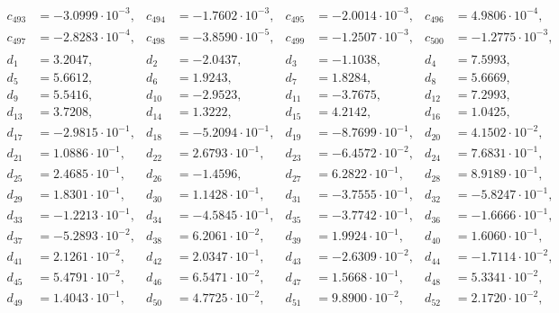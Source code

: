 \begin{align*}
c_{ 493 } &= -3.0999 \cdot 10^{ -3 }, & c_{ 494 } &= -1.7602 \cdot 10^{ -3 }, & c_{ 495 } &= -2.0014 \cdot 10^{ -3 }, & c_{ 496 } &= 4.9806 \cdot 10^{ -4 },\\ 
c_{ 497 } &= -2.8283 \cdot 10^{ -4 }, & c_{ 498 } &= -3.8590 \cdot 10^{ -5 }, & c_{ 499 } &= -1.2507 \cdot 10^{ -3 }, & c_{ 500 } &= -1.2775 \cdot 10^{ -3 },\\ 
&&&&&&& \\ 
d_{ 1 } &= 3.2047, & d_{ 2 } &= -2.0437, & d_{ 3 } &= -1.1038, & d_{ 4 } &= 7.5993,\\ 
d_{ 5 } &= 5.6612, & d_{ 6 } &= 1.9243, & d_{ 7 } &= 1.8284, & d_{ 8 } &= 5.6669,\\ 
d_{ 9 } &= 5.5416, & d_{ 10 } &= -2.9523, & d_{ 11 } &= -3.7675, & d_{ 12 } &= 7.2993,\\ 
d_{ 13 } &= 3.7208, & d_{ 14 } &= 1.3222, & d_{ 15 } &= 4.2142, & d_{ 16 } &= 1.0425,\\ 
d_{ 17 } &= -2.9815 \cdot 10^{ -1 }, & d_{ 18 } &= -5.2094 \cdot 10^{ -1 }, & d_{ 19 } &= -8.7699 \cdot 10^{ -1 }, & d_{ 20 } &= 4.1502 \cdot 10^{ -2 },\\ 
d_{ 21 } &= 1.0886 \cdot 10^{ -1 }, & d_{ 22 } &= 2.6793 \cdot 10^{ -1 }, & d_{ 23 } &= -6.4572 \cdot 10^{ -2 }, & d_{ 24 } &= 7.6831 \cdot 10^{ -1 },\\ 
d_{ 25 } &= 2.4685 \cdot 10^{ -1 }, & d_{ 26 } &= -1.4596, & d_{ 27 } &= 6.2822 \cdot 10^{ -1 }, & d_{ 28 } &= 8.9189 \cdot 10^{ -1 },\\ 
d_{ 29 } &= 1.8301 \cdot 10^{ -1 }, & d_{ 30 } &= 1.1428 \cdot 10^{ -1 }, & d_{ 31 } &= -3.7555 \cdot 10^{ -1 }, & d_{ 32 } &= -5.8247 \cdot 10^{ -1 },\\ 
d_{ 33 } &= -1.2213 \cdot 10^{ -1 }, & d_{ 34 } &= -4.5845 \cdot 10^{ -1 }, & d_{ 35 } &= -3.7742 \cdot 10^{ -1 }, & d_{ 36 } &= -1.6666 \cdot 10^{ -1 },\\ 
d_{ 37 } &= -5.2893 \cdot 10^{ -2 }, & d_{ 38 } &= 6.2061 \cdot 10^{ -2 }, & d_{ 39 } &= 1.9924 \cdot 10^{ -1 }, & d_{ 40 } &= 1.6060 \cdot 10^{ -1 },\\ 
d_{ 41 } &= 2.1261 \cdot 10^{ -2 }, & d_{ 42 } &= 2.0347 \cdot 10^{ -1 }, & d_{ 43 } &= -2.6309 \cdot 10^{ -2 }, & d_{ 44 } &= -1.7114 \cdot 10^{ -2 },\\ 
d_{ 45 } &= 5.4791 \cdot 10^{ -2 }, & d_{ 46 } &= 6.5471 \cdot 10^{ -2 }, & d_{ 47 } &= 1.5668 \cdot 10^{ -1 }, & d_{ 48 } &= 5.3341 \cdot 10^{ -2 },\\ 
d_{ 49 } &= 1.4043 \cdot 10^{ -1 }, & d_{ 50 } &= 4.7725 \cdot 10^{ -2 }, & d_{ 51 } &= 9.8900 \cdot 10^{ -2 }, & d_{ 52 } &= 2.1720 \cdot 10^{ -2 },\\ 

\end{align*}
